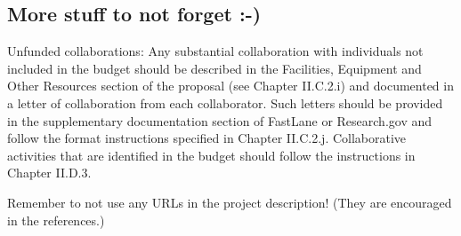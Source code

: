 \subsection{More stuff to not forget :-)}

Unfunded collaborations: Any substantial collaboration with individuals not included in the budget should be described in the Facilities, Equipment and Other Resources section of the proposal (see Chapter II.C.2.i) and documented in a letter of collaboration from each collaborator. Such letters should be provided in the supplementary documentation section of FastLane or Research.gov and follow the format instructions specified in Chapter II.C.2.j. Collaborative activities that are identified in the budget should follow the instructions in Chapter II.D.3.

Remember to not use any URLs in the project description!  (They are
encouraged in the references.)
